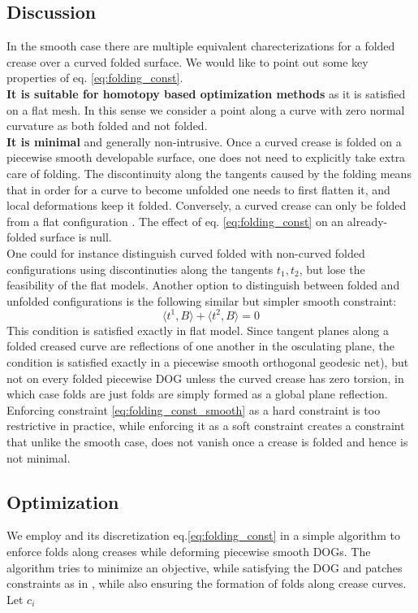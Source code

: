 \subsection{Discussion}
In the smooth case there are multiple equivalent charecterizations for a folded crease over a curved folded surface. We would like to point out some key properties of eq. \eqref{eq:folding_const}. \\
\textbf{It is suitable for homotopy based optimization methods} as it is satisfied on a flat mesh. In this sense we consider a point along a curve with zero normal curvature as both folded and not folded. \\ 
\textbf{It is minimal} and generally non-intrusive. Once a curved crease is folded on a piecewise smooth developable surface, one does not need to explicitly take extra care of folding. The discontinuity along the tangents caused by the folding means that in order for a curve to become unfolded one needs to first flatten it, and local deformations keep it folded. Conversely, a curved crease can only be folded from a flat configuration \cite{more_on_paper}. The effect of eq. \eqref{eq:folding_const} on an already-folded surface is null. \\
One could for instance distinguish curved folded with non-curved folded configurations using discontinuties along the tangents $t_1,t_2$, but lose the feasibility of the flat models. Another option to distinguish between folded and unfolded configurations is the following similar but simpler smooth constraint:
\begin{equation} \label{eq:folding_const_smooth} 
\langle t^1,B\rangle + \langle t^2,B\rangle = 0
\end{equation}
This condition is satisfied exactly in flat model. Since tangent planes along a folded creased curve are reflections of one another in the osculating plane, the condition is satisfied exactly in a piecewise smooth orthogonal geodesic net), but not on every folded piecewise DOG unless the curved crease has zero torsion, in which case folds are just folds are simply formed as a global plane reflection. Enforcing constraint \eqref{eq:folding_const_smooth} as a hard constraint is too restrictive in practice, while enforcing it as a soft constraint creates a constraint that unlike the smooth case, does not vanish once a crease is folded and hence is not minimal.

\subsection{Optimization}
We employ  and its discretization eq.\eqref{eq:folding_const} in a simple algorithm to enforce folds along creases while deforming piecewise smooth DOGs. The algorithm tries to minimize an objective, while satisfying the DOG and patches constraints as in \cite{rabi2018shape}, while also ensuring the formation of folds along crease curves.
Let $c_i$



